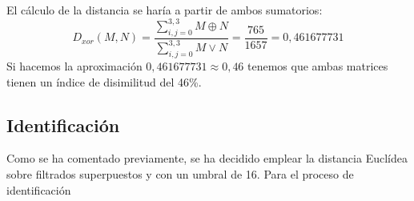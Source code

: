 El cálculo de la distancia se haría a partir de ambos sumatorios:
\[D_{xor}(M,N) = \frac 
	{\sum_{i,j=0}^{3,3} M \oplus N} 
	{\sum_{i,j=0}^{3,3} M \vee N} = \frac {765}{1657} = 0,461677731
\]
Si hacemos la aproximación $ 0,461677731 \approx 0,46 $ tenemos que ambas matrices tienen un índice de disimilitud del 46\%.


\subsection{Identificación}
Como se ha comentado previamente, se ha decidido emplear la distancia Euclídea sobre filtrados superpuestos y con un umbral de 16. Para el proceso de identificación
